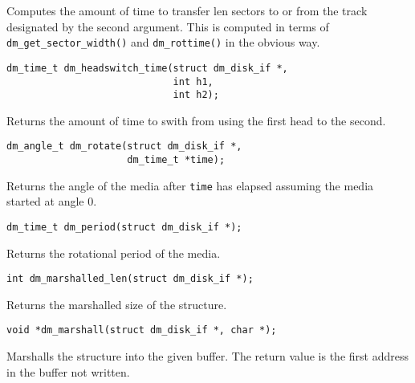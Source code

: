 Computes the amount of time to transfer len sectors to or from the
track designated by the second argument.  This is computed in terms of
\texttt{dm\_get\_sector\_width()} and \texttt{dm\_rottime()} in the
obvious way.


\begin{verbatim}
dm_time_t dm_headswitch_time(struct dm_disk_if *, 
                             int h1, 
                             int h2);
\end{verbatim}

Returns the amount of time to swith from using the first head to the
second. 


\begin{verbatim}
dm_angle_t dm_rotate(struct dm_disk_if *, 
                     dm_time_t *time);
\end{verbatim}

Returns the angle of the media after \texttt{time} has elapsed
assuming the media started at angle 0.


\begin{verbatim}
dm_time_t dm_period(struct dm_disk_if *);
\end{verbatim}

Returns the rotational period of the media.


\begin{verbatim}
int dm_marshalled_len(struct dm_disk_if *);
\end{verbatim}

Returns the marshalled size of the structure.


\begin{verbatim}
void *dm_marshall(struct dm_disk_if *, char *);
\end{verbatim}

Marshalls the structure into the given buffer.  The return value is
the first address in the buffer not written.
